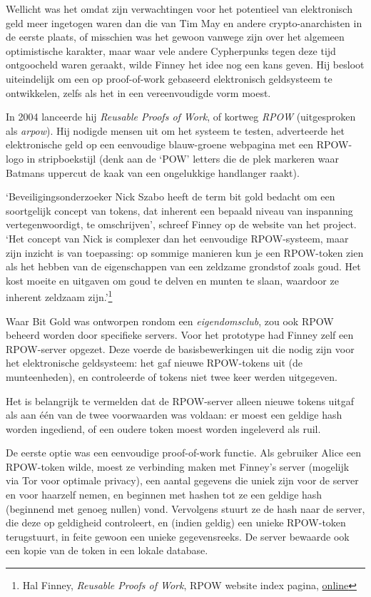 \documentclass[
  a5paper,
  smalldemyvopaper,11pt,twoside,onecolumn,openright,extrafontsizes,
hidelinks]{memoir}
\begin{document}
Wellicht was het omdat zijn verwachtingen voor het potentieel van
elektronisch geld meer ingetogen waren dan die van Tim May en andere
crypto-anarchisten in de eerste plaats, of misschien was het gewoon
vanwege zijn over het algemeen optimistische karakter, maar waar vele
andere Cypherpunks tegen deze tijd ontgoocheld waren geraakt, wilde
Finney het idee nog een kans geven. Hij besloot uiteindelijk om een op
proof-of-work gebaseerd elektronisch geldsysteem te ontwikkelen, zelfs
als het in een vereenvoudigde vorm moest.

In 2004 lanceerde hij \emph{Reusable Proofs of Work}, of kortweg
\emph{RPOW} (uitgesproken als \emph{arpow}). Hij nodigde mensen uit om
het systeem te testen, adverteerde het elektronische geld op een
eenvoudige blauw-groene webpagina met een RPOW-logo in stripboekstijl
(denk aan de `POW' letters die de plek markeren waar Batmans uppercut de
kaak van een ongelukkige handlanger raakt).

`Beveiligingsonderzoeker Nick Szabo heeft de term bit gold bedacht om
een soortgelijk concept van tokens, dat inherent een bepaald niveau van
inspanning vertegenwoordigt, te omschrijven', schreef Finney op de
website van het project. `Het concept van Nick is complexer dan het
eenvoudige RPOW-systeem, maar zijn inzicht is van toepassing: op sommige
manieren kun je een RPOW-token zien als het hebben van de eigenschappen
van een zeldzame grondstof zoals goud. Het kost moeite en uitgaven om
goud te delven en munten te slaan, waardoor ze inherent zeldzaam
zijn.'\footnote{Hal Finney, \emph{Reusable Proofs of Work}, RPOW website
  index pagina,
  \href{https://web.archive.org/web/20090217090451/http://rpow.net/index.html}{online}}

Waar Bit Gold was ontworpen rondom een \emph{eigendomsclub}, zou ook
RPOW beheerd worden door specifieke servers. Voor het prototype had
Finney zelf een RPOW-server opgezet. Deze voerde de basisbewerkingen uit
die nodig zijn voor het elektronische geldsysteem: het gaf nieuwe
RPOW-tokens uit (de munteenheden), en controleerde of tokens niet twee
keer werden uitgegeven.

Het is belangrijk te vermelden dat de RPOW-server alleen nieuwe tokens
uitgaf als aan één van de twee voorwaarden was voldaan: er moest een
geldige hash worden ingediend, of een oudere token moest worden
ingeleverd als ruil.

De eerste optie was een eenvoudige proof-of-work functie. Als gebruiker
Alice een RPOW-token wilde, moest ze verbinding maken met Finney's
server (mogelijk via Tor voor optimale privacy), een aantal gegevens die
uniek zijn voor de server en voor haarzelf nemen, en beginnen met hashen
tot ze een geldige hash (beginnend met genoeg nullen) vond. Vervolgens
stuurt ze de hash naar de server, die deze op geldigheid controleert, en
(indien geldig) een unieke RPOW-token terugstuurt, in feite gewoon een
unieke gegevensreeks. De server bewaarde ook een kopie van de token in
een lokale database.
\end{document}
